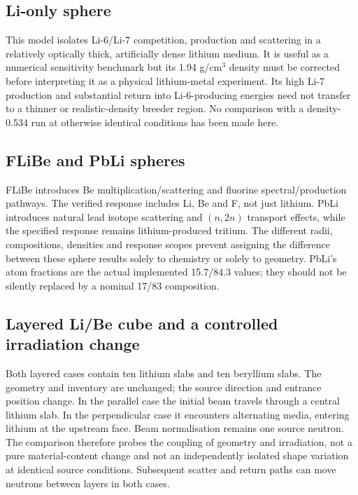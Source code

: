 \subsection{Li-only sphere}
This model isolates Li-6/Li-7 competition, production and scattering in a relatively optically thick, artificially dense lithium medium. It is useful as a numerical sensitivity benchmark but its 1.94 g/cm$^3$ density must be corrected before interpreting it as a physical lithium-metal experiment. Its high Li-7 production and substantial return into Li-6-producing energies need not transfer to a thinner or realistic-density breeder region. No comparison with a density-0.534 run at otherwise identical conditions has been made here.

\subsection{FLiBe and PbLi spheres}
FLiBe introduces Be multiplication/scattering and fluorine spectral/production pathways. The verified response includes Li, Be and F, not just lithium. PbLi introduces natural lead isotope scattering and $(n,2n)$ transport effects, while the specified response remains lithium-produced tritium. The different radii, compositions, densities and response scopes prevent assigning the difference between these sphere results solely to chemistry or solely to geometry. PbLi's atom fractions are the actual implemented 15.7/84.3 values; they should not be silently replaced by a nominal 17/83 composition.

\subsection{Layered Li/Be cube and a controlled irradiation change}
Both layered cases contain ten lithium slabs and ten beryllium slabs. The geometry and inventory are unchanged; the source direction and entrance position change. In the parallel case the initial beam travels through a central lithium slab. In the perpendicular case it encounters alternating media, entering lithium at the upstream face. Beam normalisation remains one source neutron. The comparison therefore probes the coupling of geometry and irradiation, not a pure material-content change and not an independently isolated shape variation at identical source conditions. Subsequent scatter and return paths can move neutrons between layers in both cases.


